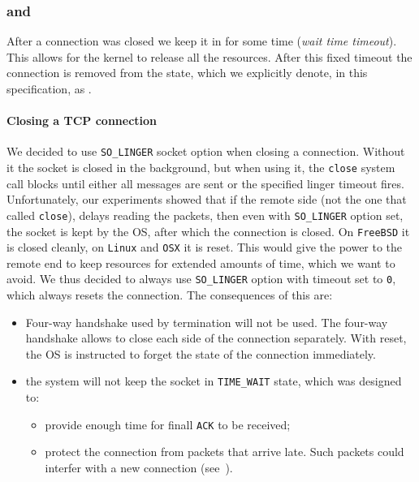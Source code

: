 \subsubsection{\TerminatingState{} and \TerminatedState{}}
After a connection was closed we keep it in \TerminatingState{} for some time
(\textit{wait time timeout}). This allows for the kernel to release all the
resources. After this fixed timeout the connection is removed from the
\connmngr{} state, which we explicitly denote, in this specification, as
\TerminatedState{}.

\paragraph{Closing a TCP connection}
We decided to use \texttt{SO\_LINGER} socket option when closing a connection.
Without it the socket is closed in the background, but when using it, the
\texttt{close} system call blocks until either all messages are sent or the
specified linger timeout fires. Unfortunately, our experiments showed that if
the remote side (not the one that called \texttt{close}), delays reading
the packets, then even with \texttt{SO\_LINGER} option set, the socket is kept
by the OS, after which the connection is closed. On \texttt{FreeBSD}
it is closed cleanly, on \texttt{Linux} and \texttt{OSX} it is reset. This
would give the power to the remote end to keep resources for extended amounts of
time, which we want to avoid. We thus decided to always use
\texttt{SO\_LINGER} option with timeout set to \texttt{0}, which always resets
the connection. The consequences of this are:

\begin{itemize}
  \item Four-way handshake used by \TCP{} termination will not be used. The
    four-way handshake allows to close each side of the connection separately.
    With reset, the OS is instructed to forget the state of the connection
    immediately.
  \item the system will not keep the socket in \texttt{TIME\_WAIT} state, which
    was designed to:
    \begin{itemize}
      \item provide enough time for finall \texttt{ACK} to be received;
      \item protect the connection from packets that arrive late. Such
        packets could interfer with a new connection
        (see~\cite{stevens2003unix}).
    \end{itemize}
\end{itemize}

